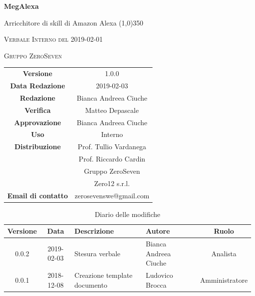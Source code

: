 \documentclass[a4paper,12pt]{article}
\author{Bianca Andreea Ciuche}
\date{2019-02-01}
\begin{document}
	\begin{titlepage}
		\centering
		{\huge\bfseries MegAlexa\par}
		Arricchitore di skill di Amazon Alexa
		\line(1,0){350} \\
		{\scshape\LARGE Verbale Interno del 2019-02-01 \par}
		\vspace{1cm}
		{\scshape Gruppo ZeroSeven \par}
		\logo
		\begin{tabular}{c|c}
			{\hfill \textbf{Versione}} 			& 1.0.0				\\
			{\hfill\textbf{Data Redazione}} 	& 2019-02-03		\\ 
			{\hfill\textbf{Redazione}} 			&  		Bianca Andreea Ciuche		\\ 
			{\hfill\textbf{Verifica}} 				&  	  	Matteo Depascale\\ 
			{\hfill\textbf{Approvazione}} 		&  	Bianca Andreea Ciuche\\ 
			{\hfill\textbf{Uso}} 					& 	Interno	\\ 
			{\hfill\textbf{Distribuzione}} 			& 			Prof. Tullio Vardanega \\ & Prof. Riccardo Cardin \\ & Gruppo ZeroSeven \\ & Zero12 s.r.l.	\\ 
			{\hfill\textbf{Email di contatto}} & zerosevenswe@gmail.com \\
		\end{tabular}
	\end{titlepage}
	
	
	
	\label{LastFrontPage}
	
	
	\newpage
	\cleardoublepage
	\begin{table}[tbph]
		\centering
		\begin{tabularx}{\textwidth}{|c|c|X|X|c|}
			\hline
			\textbf{Versione} & \textbf{Data} & \textbf{Descrizione} & \textbf{Autore} & \textbf{Ruolo} \\
			\hline
			0.0.2 & 2019-02-03 & Stesura verbale &Bianca Andreea Ciuche  & Analista \\
			\hline
			0.0.1 & 2018-12-08 & Creazione template documento & Ludovico Brocca & Amministratore\\
			\hline
		\end{tabularx}
		\caption{Diario delle modifiche}
	\end{table}
	\cleardoublepage
	\pagestyle{mymain}
	
\end{document}
